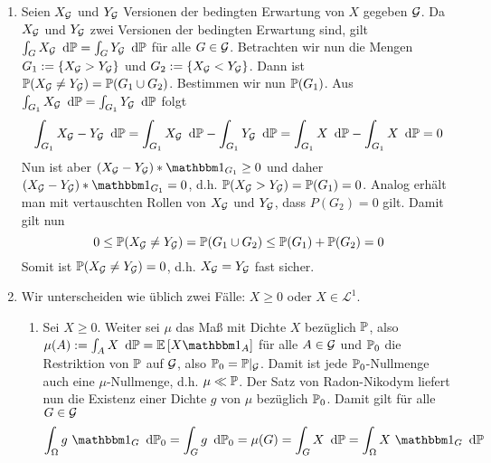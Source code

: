 \begin{exercisePage}
	\begin{enumerate}[leftmargin=*, label=(zu \alph*)]
		\item Seien $X_{\mathG}$ und $Y_{\mathG}$ Versionen der bedingten Erwartung von $X$ gegeben $\mathG$. 
		Da $X_{\mathG}$ und $Y_{\mathG}$ zwei Versionen der bedingten Erwartung sind, gilt $\int_G X_{\mathG} \diff{\P} = \int_G Y_{\mathG} \diff{\P}$ für alle $G \in \mathG$. Betrachten wir nun die Mengen $G_1 \defeq \menge{X_{\mathG} > Y_{\mathG}}$ und $G_2 \defeq \menge{X_{\mathG} < Y_{\mathG}}$. Dann ist $\P(X_{\mathG} \neq Y_{\mathG}) = \P(G_1 \cup G_2)$. 
		Bestimmen wir nun $\P(G_1)$. Aus $\int_{G_1} X_{\mathG} \diff{\P} = \int_{G_1} Y_{\mathG} \diff{\P}$ folgt
		\begin{equation*}
			\int_{G_1} X_{\mathG} - Y _{\mathG} \diff{\P} 
			= \int_{G_1} X_{\mathG} \diff{\P} - \int_{G_1} Y_{\mathG} \diff{\P} = \int_{G_1} X \diff{\P} - \int_{G_1} X \diff{\P} = 0
		\end{equation*}
		Nun ist aber $(X_{\mathG} - Y_{\mathG}) * \one_{G_1} \ge 0$ und daher $(X_{\mathG}  - Y _{\mathG}) * \one_{G_1} = 0$, d.h. $\P(X_{\mathG} > Y_{\mathG}) = \P(G_1) = 0$.
		Analog erhält man mit vertauschten Rollen von $X_{\mathG}$ und $Y_{\mathG}$, dass $P(G_2) = 0$ gilt. Damit gilt nun 
		\begin{equation*}
			0 \le \P(X_{\mathG} \neq Y_{\mathG}) = \P(G_1 \cup G_2) \le \P(G_1) + \P(G_2) = 0
		\end{equation*}
		Somit ist $\P(X_{\mathG} \ne Y_{\mathG}) = 0$, d.h. $X_{\mathG} = Y_{\mathG}$ fast sicher.
		\item Wir unterscheiden wie üblich zwei Fälle: $X \ge 0$ oder $X \in \mathcal{L}^1$.
		\begin{enumerate}[wide, leftmargin=*, label=(\roman*), nolistsep]
			\item Sei $X \ge 0$. Weiter sei $\mu$ das Maß mit Dichte $X$ bezüglich $\P$, also $\mu(A) \defeq \int_A X \diff{\P} = \EW[X \one_A]$ für alle $A \in \mathG$ und $\P_0$ die Restriktion von $\P$ auf $\mathG$, also $\P_0 = \P |_{\mathG}$. Damit ist jede $\P_0$-Nullmenge auch eine $\mu$-Nullmenge, d.h. $\mu \ll \P$. Der Satz von Radon-Nikodym liefert nun die Existenz einer Dichte $g$ von $\mu$ bezüglich $\P_0$. Damit gilt für alle $G \in \mathG$
			\begin{equation*}
				\int_{\Omega} g \ \one_G \diff{\P_0} = \int_G g \diff{\P_0} = \mu(G) = \int_G X \diff{\P} = \int_{\Omega} X \ \one_G \diff{\P}
			\end{equation*}

\end{enumerate}
\end{enumerate}
\end{exercisePage}
